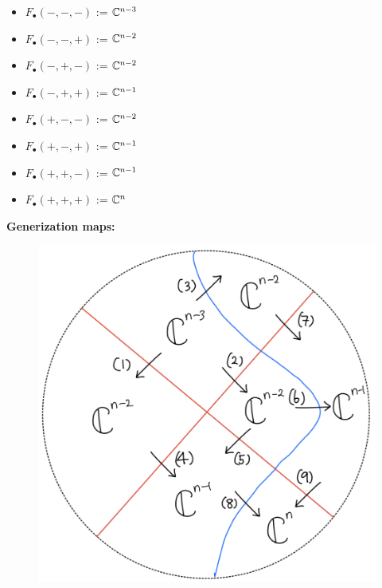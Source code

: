 \begin{itemize}
\item $F_\bullet(-,-,-)$ := $\mathbb{C}^{n-3}$
\item $F_\bullet(-,-,+)$ := $\mathbb{C}^{n-2}$
\item $F_\bullet(-,+,-)$ := $\mathbb{C}^{n-2}$
\item $F_\bullet(-,+,+)$ := $\mathbb{C}^{n-1}$
\item $F_\bullet(+,-,-)$ := $\mathbb{C}^{n-2}$
\item $F_\bullet(+,-,+)$ := $\mathbb{C}^{n-1}$
\item $F_\bullet(+,+,-)$ := $\mathbb{C}^{n-1}$
\item $F_\bullet(+,+,+)$ := $\mathbb{C}^n$
\end{itemize}

\textbf{Generization maps:}
\begin{figure}[H]
    \centering
    \includegraphics[scale = 0.45]{diagrams/cobord'4/28.png}
    \caption{}
    \label{fig:your-label}
\end{figure}
